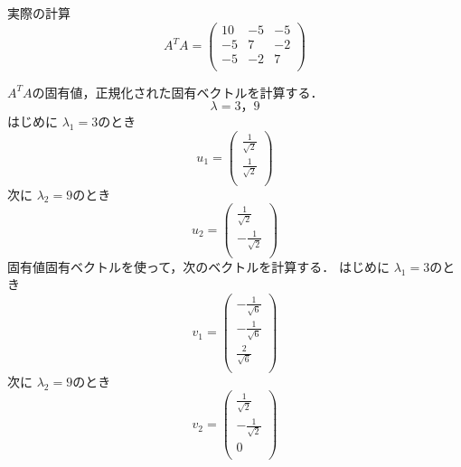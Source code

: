 \documentclass[12pt]{jsarticle}
\begin{document}
実際の計算
\begin{equation}
  A^T A=\left( \begin{array}{rrcr}
  10      & -5       & -5    \\
  -5      & 7        & -2    \\
  -5      & -2       & 7     \\
  \end{array} \right)
\end{equation}

$A^T A$の固有値，正規化された固有ベクトルを計算する．
\begin{equation}
  \label{eigen_value}
  \lambda = 3，9
\end{equation}
はじめに $\lambda_1 = 3$のとき
\begin{equation}
  \label{eigen_vector_lambda1}
  u_1 = \left(\begin{array}{rrcr}
  \frac{1}{\sqrt{2}} \\
  \frac{1}{\sqrt{2}} \\
  \end{array} \right)
\end{equation}
次に $\lambda_2 = 9$のとき
\begin{equation}
  \label{eigen_vector_lambda2}
  u_2 = \left(\begin{array}{rrcr}
  \frac{1}{\sqrt{2}} \\
  -\frac{1}{\sqrt{2}} \\
  \end{array} \right)
\end{equation}
固有値固有ベクトルを使って，次のベクトルを計算する．
はじめに $\lambda_1 = 3$のとき
\begin{equation}
  \label{v_vector_1}
  v_1 = \left(\begin{array}{rrcr}
  -\frac{1}{\sqrt{6}} \\
  -\frac{1}{\sqrt{6}} \\
  \frac{2}{\sqrt{6}} \\
  \end{array}\right)
\end{equation}
次に $\lambda_2 = 9$のとき
\begin{equation}
  \label{v_vector_2}
  v_2 = \left(\begin{array}{rrcr}
  \frac{1}{\sqrt{2}} \\
  -\frac{1}{\sqrt{2}} \\
  0 \\
  \end{array}\right)
\end{equation}
\end{document}
